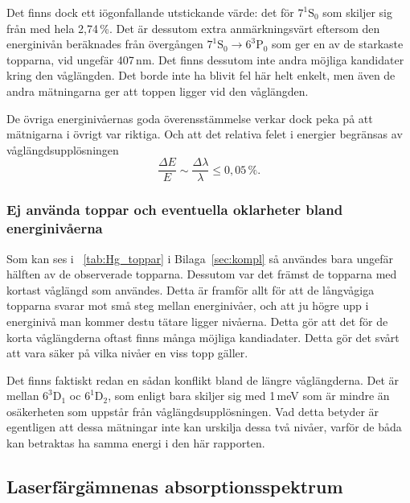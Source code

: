 \documentclass[11pt,a4paper]{article}
\newcommand{\tabref}{\tablename~\ref} %
\begin{document}
Det finns dock ett iögonfallande utstickande värde: det för
$7^1\mathrm{S}_0$ som skiljer sig från \cite{NIST_levels} med hela
2,74\,\%. Det är dessutom extra anmärkningsvärt eftersom den
energinivån beräknades från övergången 
$7^1\mathrm{S}_0 \to 6^3\mathrm{P}_0$ som ger en av de starkaste
topparna, vid ungefär 407\,nm. Det finns dessutom inte andra möjliga
kandidater kring den våglängden. Det borde inte ha blivit fel här helt
enkelt, men även de andra mätningarna ger att toppen ligger vid den
våglängden. 

De övriga energinivåernas goda överensstämmelse verkar dock peka på
att mätnigarna i övrigt var riktiga. Och att det relativa felet i
energier begränsas av våglängdsupplösningen\footnotemark{}
\[
\frac{\Delta E}{E} \sim \frac{\Delta\lambda}{\lambda} \le 0,05\,\%.
\]

\subsubsection{Ej använda toppar 
               och eventuella oklarheter bland energinivåerna}

Som kan ses i \tabref{tab:Hg_toppar} i Bilaga~\ref{sec:kompl} så
användes bara ungefär hälften av de observerade topparna. Dessutom var
det främst de topparna med kortast våglängd som användes. Detta är
framför allt för att de långvågiga topparna svarar mot små steg
mellan energinivåer, och att ju högre upp i energinivå man kommer
destu tätare ligger nivåerna. Detta gör att det för de korta
våglängderna oftast finns många möjliga kandiadater. Detta gör det
svårt att vara säker på vilka nivåer en viss topp gäller. 

Det finns faktiskt redan en sådan konflikt bland de längre
våglängderna. Det är mellan $6^3\mathrm{D}_1$ oc $6^1\mathrm{D}_2$,
som enligt \cite{NIST_levels} bara skiljer sig med 1\,meV som är
mindre än osäkerheten som uppstår från våglängdsupplösningen. Vad
detta betyder är egentligen att dessa mätningar inte kan urskilja
dessa två nivåer, varför de båda kan betraktas ha samma energi i den
här rapporten. 


\subsection{Laserfärgämnenas absorptionsspektrum}
\end{document}
